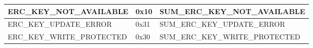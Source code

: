 \begin{longtable}{|l|l|l|}
\begin{minipage}{0.38\linewidth}\raggedright\vspace{.75ex}ERC\_KEY\_NOT\_AVAILABLE\vspace{.75ex}\end{minipage} & \begin{minipage}{0.15\linewidth}\raggedright\vspace{.75ex}0x10\vspace{.75ex}\end{minipage} & \begin{minipage}{0.38\linewidth}\raggedright\vspace{.75ex}SUM\_ERC\_KEY\_NOT\_AVAILABLE\vspace{.75ex}\end{minipage}\\\hline
\begin{minipage}{0.38\linewidth}\raggedright\vspace{.75ex}ERC\_KEY\_UPDATE\_ERROR\vspace{.75ex}\end{minipage} & \begin{minipage}{0.15\linewidth}\raggedright\vspace{.75ex}0x31\vspace{.75ex}\end{minipage} & \begin{minipage}{0.38\linewidth}\raggedright\vspace{.75ex}SUM\_ERC\_KEY\_UPDATE\_ERROR\vspace{.75ex}\end{minipage}\\\hline
\begin{minipage}{0.38\linewidth}\raggedright\vspace{.75ex}ERC\_KEY\_WRITE\_PROTECTED\vspace{.75ex}\end{minipage} & \begin{minipage}{0.15\linewidth}\raggedright\vspace{.75ex}0x30\vspace{.75ex}\end{minipage} & \begin{minipage}{0.38\linewidth}\raggedright\vspace{.75ex}SUM\_ERC\_KEY\_WRITE\_PROTECTED\vspace{.75ex}\end{minipage}\\\hline

\end{longtable}
